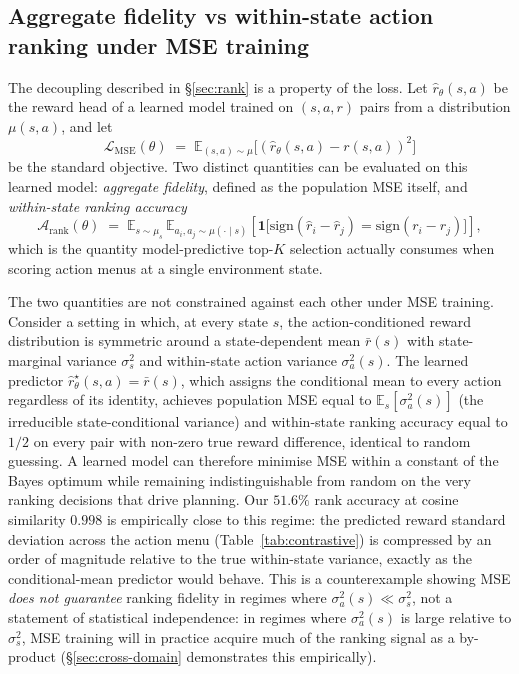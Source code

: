 \documentclass[11pt]{article}
\begin{document}
\subsection*{Aggregate fidelity vs within-state action ranking under MSE training}\label{sec:methods-fidelity-vs-ranking}

The decoupling described in \S\ref{sec:rank} is a property of the loss. Let $\hat{r}_\theta(s, a)$ be the reward head of a learned model trained on $(s, a, r)$ pairs from a distribution $\mu(s, a)$, and let
\begin{equation}
\mathcal{L}_{\text{MSE}}(\theta) \;=\; \mathbb{E}_{(s,a)\sim\mu}\big[(\hat{r}_\theta(s,a) - r(s,a))^2\big]
\end{equation}
be the standard objective. Two distinct quantities can be evaluated on this learned model: \emph{aggregate fidelity}, defined as the population MSE itself, and \emph{within-state ranking accuracy}
\begin{equation}
\mathcal{A}_{\text{rank}}(\theta) \;=\; \mathbb{E}_{s\sim\mu_s}\,\mathbb{E}_{a_i,a_j\sim\mu(\cdot \mid s)}\!\left[\mathbf{1}\big[\mathrm{sign}(\hat{r}_i - \hat{r}_j) = \mathrm{sign}(r_i - r_j)\big]\right],
\end{equation}
which is the quantity model-predictive top-$K$ selection actually consumes when scoring action menus at a single environment state.

The two quantities are not constrained against each other under MSE training. Consider a setting in which, at every state $s$, the action-conditioned reward distribution is symmetric around a state-dependent mean $\bar{r}(s)$ with state-marginal variance $\sigma_s^2$ and within-state action variance $\sigma_a^2(s)$. The learned predictor $\hat{r}_\theta^{\star}(s,a) = \bar{r}(s)$, which assigns the conditional mean to every action regardless of its identity, achieves population MSE equal to $\mathbb{E}_s[\sigma_a^2(s)]$ (the irreducible state-conditional variance) and within-state ranking accuracy equal to $1/2$ on every pair with non-zero true reward difference, identical to random guessing. A learned model can therefore minimise MSE within a constant of the Bayes optimum while remaining indistinguishable from random on the very ranking decisions that drive planning. Our $51.6\%$ rank accuracy at cosine similarity $0.998$ is empirically close to this regime: the predicted reward standard deviation across the action menu (Table~\ref{tab:contrastive}) is compressed by an order of magnitude relative to the true within-state variance, exactly as the conditional-mean predictor would behave. This is a counterexample showing MSE \emph{does not guarantee} ranking fidelity in regimes where $\sigma_a^2(s) \ll \sigma_s^2$, not a statement of statistical independence: in regimes where $\sigma_a^2(s)$ is large relative to $\sigma_s^2$, MSE training will in practice acquire much of the ranking signal as a by-product (\S\ref{sec:cross-domain} demonstrates this empirically).
\end{document}
